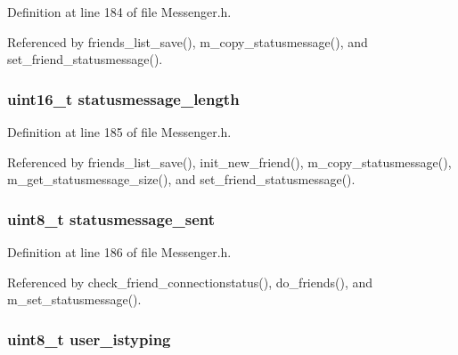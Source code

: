 Definition at line 184 of file Messenger.\+h.



Referenced by friends\+\_\+list\+\_\+save(), m\+\_\+copy\+\_\+statusmessage(), and set\+\_\+friend\+\_\+statusmessage().

\hypertarget{struct_friend_a43fe9dde52dc12e90933150eca91c0c3}{
\subsubsection[{statusmessage\+\_\+length}]{\setlength{\rightskip}{0pt plus 5cm}uint16\+\_\+t statusmessage\+\_\+length}}\label{struct_friend_a43fe9dde52dc12e90933150eca91c0c3}


Definition at line 185 of file Messenger.\+h.



Referenced by friends\+\_\+list\+\_\+save(), init\+\_\+new\+\_\+friend(), m\+\_\+copy\+\_\+statusmessage(), m\+\_\+get\+\_\+statusmessage\+\_\+size(), and set\+\_\+friend\+\_\+statusmessage().

\hypertarget{struct_friend_ad39189cd22b356c314e4d980b55db259}{
\subsubsection[{statusmessage\+\_\+sent}]{\setlength{\rightskip}{0pt plus 5cm}uint8\+\_\+t statusmessage\+\_\+sent}}\label{struct_friend_ad39189cd22b356c314e4d980b55db259}


Definition at line 186 of file Messenger.\+h.



Referenced by check\+\_\+friend\+\_\+connectionstatus(), do\+\_\+friends(), and m\+\_\+set\+\_\+statusmessage().

\hypertarget{struct_friend_a68e945edd5a63c22371edf481c788d88}{
\subsubsection[{user\+\_\+istyping}]{\setlength{\rightskip}{0pt plus 5cm}uint8\+\_\+t user\+\_\+istyping}}\label{struct_friend_a68e945edd5a63c22371edf481c788d88}


